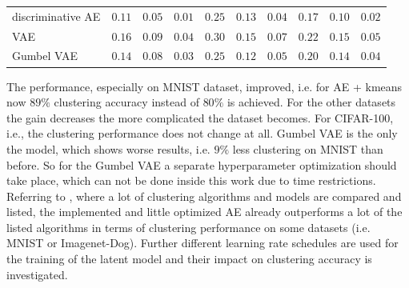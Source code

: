 \documentclass[12pt,DIV14,BCOR12mm,a4paper,footexclude,headinclude,halfparskip-,twoside,openright,cleardoubleempty,idxtotoc,bibtotoc,listtotoc]{scrreprt} %
\numberwithin{equation}{chapter}
\begin{document}
\begin{table}[htb!]
\begin{tabular}{l|ccccccccc}
        		discriminative AE & $0.11$ & $0.05$ & $0.01$ & $0.25$ & $0.13$ & $0.04$ & $0.17$ & $0.10$ & $0.02$\\
        		VAE & $\mathbf{0.16}$ & $\mathbf{0.09}$ & $\mathbf{0.04}$ & $\mathbf{0.30}$ & $\mathbf{0.15}$ & $\mathbf{0.07}$ & $\mathbf{0.22}$ & $0.15$ & $\mathbf{0.05}$\\
        		Gumbel VAE & $0.14$ & $0.08$ & $0.03$ & $0.25$ & $0.12$ & $0.05$ & $0.20$ & $0.14$ & $0.04$\\
        		\bottomrule
    		\end{tabular}
	\end{table}
The performance, especially on MNIST dataset, improved, i.e. for AE + kmeans now $89\%$ clustering accuracy instead of $80\%$ is achieved. For the other datasets the gain decreases the more complicated the dataset becomes. For CIFAR-100, i.e., the clustering performance does not change at all. Gumbel VAE is the only the model, which shows worse results, i.e. $9\%$ less clustering on MNIST than before. So for the Gumbel VAE a separate hyperparameter optimization should take place, which can not be done inside this work due to time restrictions. Referring to \cite{Chang17DAC}, where a lot of clustering algorithms and models are compared and listed, the implemented and little optimized AE already outperforms a lot of the listed algorithms in terms of clustering performance on some datasets (i.e. MNIST or Imagenet-Dog). Further different learning rate schedules are used for the training of the latent model and their impact on clustering accuracy is investigated.
\end{document}
